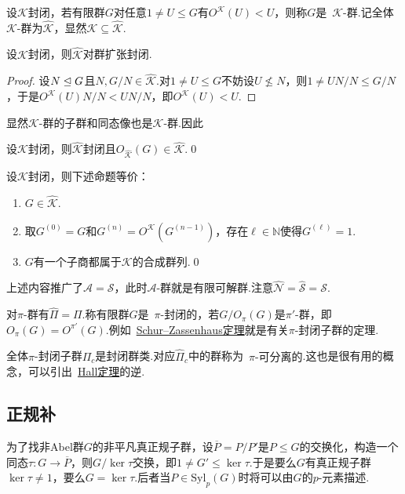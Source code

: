 设$\mathcal{K}$封闭，若有限群$G$对任意$1\ne U\le G$有$O^{\mathcal{K}}(U)<U$，则称$G$是~{\heiti $\mathcal{K}$-群}.记全体$\mathcal{K}$-群为$\widehat{\mathcal{K}}$，显然$\mathcal{K}\subseteq\widehat{\mathcal{K}}$.

\begin{prop}
	设$\mathcal{K}$封闭，则$\widehat{\mathcal{K}}$对群扩张封闭.
\end{prop}
\begin{proof}
	设$N\trianglelefteq G$且$N,G/N\in\widehat{\mathcal{K}}$.对$1\ne U\le G$不妨设$U\nleq N$，则$1\ne UN/N\le G/N$，于是$O^{\mathcal{K}}(U)N/N<UN/N$，即$O^{\mathcal{K}}(U)<U$.
\end{proof}

显然$\mathcal{K}$-群的子群和同态像也是$\mathcal{K}$-群.因此
\begin{prop}
	设$\mathcal{K}$封闭，则$\widehat{\mathcal{K}}$封闭且$O_{\widehat{\mathcal{K}}}(G)\in\widehat{\mathcal{K}}$.\qed
\end{prop}
\begin{prop}
	设$\mathcal{K}$封闭，则下述命题等价：
	\begin{enumerate}
		\item $G\in\widehat{\mathcal{K}}$.
		\item 取$G^{(0)}=G$和$G^{(n)}=O^{\mathcal{K}}(G^{(n-1)})$，存在$\ell\in\mathbb{N}$使得$G^{(\ell)}=1$.
		\item $G$有一个子商都属于$\mathcal{K}$的合成群列.\qed
	\end{enumerate}
\end{prop}
\begin{remark}
	上述内容推广了$\widehat{\mathcal{A}}=\mathcal{S}$，此时$\mathcal{A}$-群就是有限可解群.注意$\widehat{\mathcal{N}}=\widehat{\mathcal{S}}=\mathcal{S}$.
\end{remark}
\begin{remark}
	对$\pi$-群有$\widehat{\Pi}=\Pi$.称有限群$G$是~{\heiti $\pi$-封闭的}，若$G/O_\pi(G)$是$\pi'$-群，即$O_\pi(G)=O^{\pi'}(G)$.例如~\hyperlink{thm:SchurZassenhaus}{Schur--Zassenhaus定理}就是有关$\pi$-封闭子群的定理.
	
	全体$\pi$-封闭子群$\Pi_c$是封闭群类.对应$\widehat{\Pi}_c$中的群称为~{\heiti $\pi$-可分离的}.这也是很有用的概念，可以引出~\hyperlink{thm:Hall}{Hall定理}的逆.
\end{remark}

\subsection{正规补}\label{subsec:NormalComplement}
为了找非Abel群$G$的非平凡真正规子群，设$\overline{P}=P/P'$是$P\le G$的交换化，构造一个同态$\tau\colon G\to\overline{P}$，则$G/\ker\tau$交换，即$1\ne G'\le\ker\tau$.于是要么$G$有真正规子群$\ker\tau\ne 1$，要么$G=\ker\tau$.后者当$P\in\mathrm{Syl}_p(G)$时将可以由$G$的$p$-元素描述.

